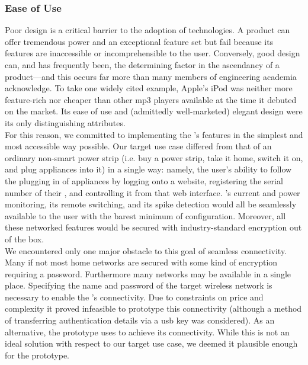 \subsubsection{Ease of Use}
Poor design is a critical barrier to the adoption of technologies. A product can offer tremendous power and an exceptional feature set but fail because its features are inaccessible or incomprehensible to the user. Conversely, good design can, and has frequently been, the determining factor in the ascendancy of a product---and this occurs far more than many members of engineering academia acknowledge. To take one widely cited example, Apple's iPod was neither more feature-rich nor cheaper than other mp3 players available at the time it debuted on the market. Its ease of use and (admittedly well-marketed) elegant design were its only distinguishing attributes.\\

For this reason, we committed to implementing the \netlet's features in the simplest and most accessible way possible. Our target use case differed from that of an ordinary non-smart power strip (i.e. buy a power strip, take it home, switch it on, and plug appliances into it) in a single way: namely, the user's ability to follow the plugging in of appliances by logging onto a website, registering the serial number of their \netlet, and controlling it from that web interface. \netlet's current and power monitoring, its remote switching, and its spike detection would all be seamlessly available to the user with the barest minimum of configuration. Moreover, all these networked features would be secured with industry-standard encryption out of the box.\\

We encountered only one major obstacle to this goal of seamless connectivity. Many if not most home \wifi networks are secured with some kind of encryption requiring a password. Furthermore many \wifi networks may be available in a single place. Specifying the name and password of the target wireless network is necessary to enable the \netlet's connectivity. Due to constraints on price and complexity it proved infeasible to prototype this connectivity (although a  method of transferring authentication details via a usb key was considered). As an alternative, the prototype \netlet uses \ethernet to achieve its connectivity. While this is not an ideal solution with respect to our target use case, we deemed it plausible enough for the prototype.\\
